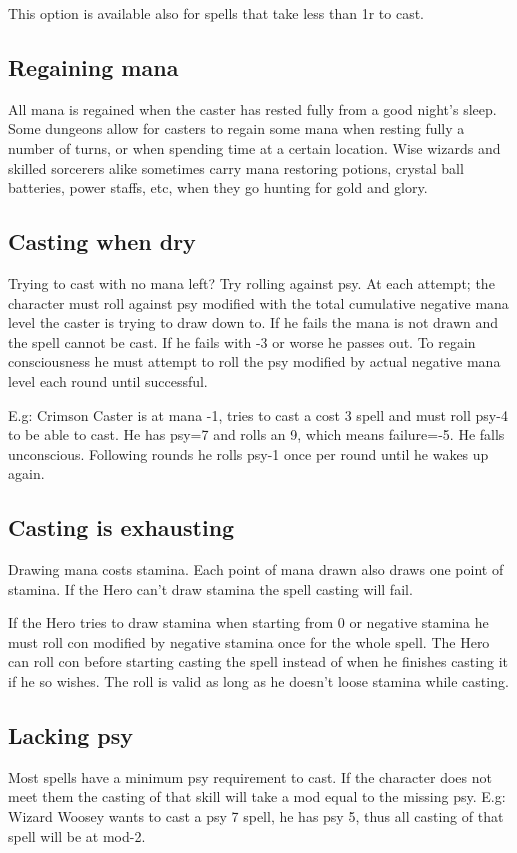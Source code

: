 This option is available also for spells that take less than 1r to cast.


\subsection*{Regaining mana}
All mana is regained when the caster has rested fully from a good night's sleep. Some dungeons allow for casters to regain some mana when resting fully a number of turns, or when spending time at a certain location.
Wise wizards and skilled sorcerers alike sometimes carry mana restoring potions, crystal ball batteries, power staffs, etc, when they go hunting for gold and glory.


\subsection*{Casting when dry}
Trying to cast with no mana left? Try rolling against psy. At each attempt; the character must roll against psy modified with the total cumulative negative mana level the caster is trying to draw down to. If he fails the mana is not drawn and the spell cannot be cast. If he fails with -3 or worse he passes out. To regain consciousness he must attempt to roll the psy modified by actual negative mana level each round until successful.

E.g: Crimson Caster is at mana -1, tries to cast a cost 3 spell and must roll psy-4 to be able to cast. He has psy=7 and rolls an 9, which means failure=-5. He falls unconscious. Following rounds he rolls psy-1 once per round until he wakes up again.


\subsection*{Casting is exhausting}
Drawing mana costs stamina. Each point of mana drawn also draws one point of stamina. If the Hero can't draw stamina the spell casting will fail.

If the Hero tries to draw stamina when starting from 0 or negative stamina he must roll con modified by negative stamina once for the whole spell. The Hero can roll con before starting casting the spell instead of when he finishes casting it if he so wishes. The roll is valid as long as he doesn't loose stamina while casting.


\subsection*{Lacking psy}
Most spells have a minimum psy requirement to cast. If the character does not meet them the casting of that skill will take a mod equal to the missing psy.
E.g: Wizard Woosey wants to cast a psy 7 spell, he has psy 5, thus all casting of that spell will be at mod-2.


